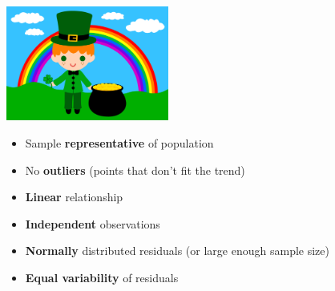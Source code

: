 \documentclass[14pt]{extarticle}
\providecommand{\tightlist}{%
  \setlength{\itemsep}{0pt}\setlength{\parskip}{0pt}}
\begin{document}
\includegraphics[width=0.4\textwidth]{leprechaun.png}

\begin{itemize}
\tightlist
\item
  Sample \textbf{representative} of population
\item
  No \textbf{outliers} (points that don't fit the trend)
\item
  \textbf{Linear} relationship
\item
  \textbf{Independent} observations
\item
  \textbf{Normally} distributed residuals (or large enough sample size)
\item
  \textbf{Equal variability} of residuals
\end{itemize}

\newpage
\end{document}

